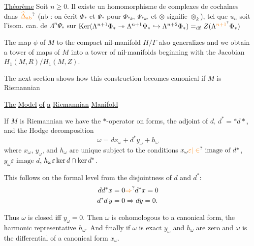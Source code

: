 \uline{Théorème} Soit $n\geq0$. Il existe un homomorphisme de complexes de cochaînes dans $\unsure{\widehat{\Delta}_{\mathrm{ab}}}$
(nb : on écrit $\Phi_*$ et $\Psi_*$ pour $\Phi_{*k}$, $\Psi_{*k}$, et $\otimes$ signifie $\otimes_k$), tel que $u_n$ soit l'isom. can. de $\Lambda^n\Psi_*$ sur $\operatorname{Ker}(\Lambda^{n+1}\Phi_*\twoheadrightarrow\Lambda^{n+1}\Psi_*\hookrightarrow\Lambda^{n+2}\Phi_*)=_{\mathrm{df}}Z(\Lambda^{\unsure{n+1}}\Phi_*)$

The map $\phi$ of $M$ to the compact nil-manifold $H/\Gamma$ also generalizes and we obtain a tower of maps of $M$ into a tower of nil-manifolds beginning with the Jacobian $H_1(M,R)/H_1(M,Z)$.

The next section shows how this construction becomes canonical if $M$ is Riemannian

\uline{The} \uline{Model} \uline{of} \uline{a} \uline{Riemannian} \uline{Manifold}

If $M$ is Riemannian we have the $*$-operator on forms, the adjoint of $d$, $d^*=*d*$, and the Hodge decomposition
\[
\omega=dx_\omega+d^*y_\omega+h_\omega
\]
where $x_\omega$, $y_\omega$, and $h_\omega$ are unique subject to the conditions $x_\omega\unsure{\varepsilon|\in}\text{ image of }d^*$, $y_\omega\varepsilon\text{ image }d$, $h_\omega\varepsilon\ker d\cap\ker d^*$.

This follows on the formal level from the \textquotedbl{}disjointness\textquotedbl{} of $d$ and $d^*$:
\[
\begin{aligned}
dd^*x=0&\unsure{\Rightarrow}d^*x=0\\
d^*d\,y=0&\Rightarrow dy=0.
\end{aligned}
\]

Thus $\omega$ is closed iff $y_\omega=0$. Then $\omega$ is cohomologous to a canonical form, the harmonic representative $h_\omega$. And finally if $\omega$ is exact $y_\omega$ and $h_\omega$ are zero and $\omega$ is the differential of a canonical form $x_\omega$.

